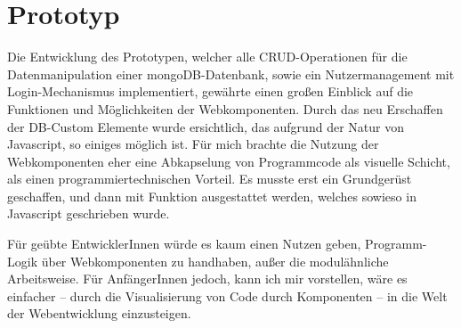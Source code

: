 \section{Prototyp}
Die Entwicklung des Prototypen, welcher alle CRUD-Operationen für die Datenmanipulation einer mongoDB-Datenbank, sowie ein Nutzermanagement mit Login-Mechanismus implementiert, gewährte einen großen Einblick auf die Funktionen und Möglichkeiten der Webkomponenten. Durch das neu Erschaffen der DB-Custom Elemente wurde ersichtlich, das aufgrund der Natur von Javascript, so einiges möglich ist. Für mich brachte die Nutzung der Webkomponenten eher eine Abkapselung von Programmcode als visuelle Schicht, als einen programmiertechnischen Vorteil. Es musste erst ein Grundgerüst geschaffen, und dann mit Funktion ausgestattet werden, welches sowieso in Javascript geschrieben wurde. 

Für geübte EntwicklerInnen würde es kaum einen Nutzen geben, Programm-Logik über Webkomponenten zu handhaben, außer die modulähnliche Arbeitsweise. Für AnfängerInnen jedoch, kann ich mir vorstellen, wäre es einfacher -- durch die Visualisierung von Code durch Komponenten -- in die Welt der Webentwicklung einzusteigen. 